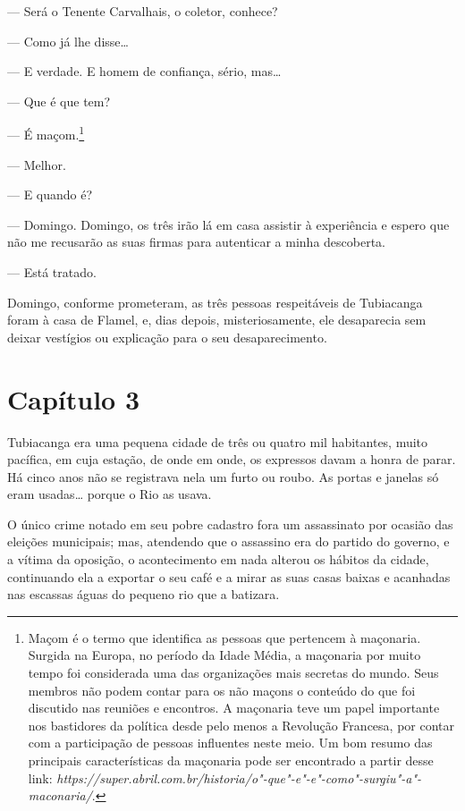 --- Será o Tenente Carvalhais, o coletor, conhece?

--- Como já lhe disse\ldots{}

--- E verdade. E homem de confiança, sério, mas\ldots{}

--- Que é que tem?

--- É maçom.\footnote{Maçom é o termo que identifica as pessoas que
  pertencem à maçonaria. Surgida na Europa, no período da Idade Média, a
  maçonaria por muito tempo foi considerada uma das organizações mais
  secretas do mundo. Seus membros não podem contar para os não maçons o
  conteúdo do que foi discutido nas reuniões e encontros. A maçonaria
  teve um papel importante nos bastidores da política desde pelo menos a
  Revolução Francesa, por contar com a participação de pessoas
  influentes neste meio. Um bom resumo das principais características da
  maçonaria pode ser encontrado a partir desse link:
  \emph{https://super.abril.com.br/historia/o"-que"-e"-e"-como"-surgiu"-a"-maconaria/}.}

--- Melhor.

--- E quando é?

--- Domingo. Domingo, os três irão lá em casa assistir à experiência e
espero que não me recusarão as suas firmas para autenticar a minha
descoberta.

--- Está tratado.

Domingo, conforme prometeram, as três pessoas respeitáveis de Tubiacanga
foram à casa de Flamel, e, dias depois, misteriosamente, ele desaparecia
sem deixar vestígios ou explicação para o seu desaparecimento.

\section*{Capítulo 3}

Tubiacanga era uma pequena cidade de três ou quatro mil habitantes,
muito pacífica, em cuja estação, de onde em onde, os expressos davam a
honra de parar. Há cinco anos não se registrava nela um furto ou roubo.
As portas e janelas só eram usadas\ldots{} porque o Rio as usava.

O único crime notado em seu pobre cadastro fora um assassinato por
ocasião das eleições municipais; mas, atendendo que o assassino era do
partido do governo, e a vítima da oposição, o acontecimento em nada
alterou os hábitos da cidade, continuando ela a exportar o seu café e a
mirar as suas casas baixas e acanhadas nas escassas águas do pequeno rio
que a batizara.

